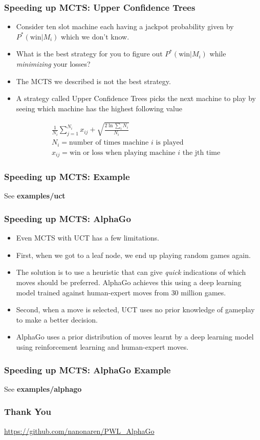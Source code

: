 \documentclass{beamer}
\begin{document}
\begin{frame}
  \frametitle{Speeding up MCTS: Upper Confidence Trees}
  \begin{itemize}
  \item Consider ten slot machine each having a jackpot probability given by $P^*(\text{win} | M_i)$ which we don't know.
    \pause
  \item What is the best strategy for you to figure out $P^*(\text{win} | M_i)$ while \emph{minimizing} your losses?
    \pause
  \item The MCTS we described is not the best strategy.
    \pause
  \item A strategy called Upper Confidence Trees picks the next machine to play by seeing which machine has the highest following value
  \end{itemize}
  \pause
  \begin{align*}
    &\frac{1}{N_i}\sum_{j=1}^{N_i} x_{ij} + \sqrt{\frac{2\ln \sum_i N_i}{N_i}}\\
    &N_i = \text{number of times machine } i \text{ is played}\\
    &x_{ij} = \text{win or loss when playing machine } i \text{ the jth time}
  \end{align*}
\end{frame}

\begin{frame}
  \frametitle{Speeding up MCTS: Example}
  \begin{center}
    See \textbf{examples/uct}
  \end{center}
\end{frame}

\begin{frame}
  \frametitle{Speeding up MCTS: AlphaGo}
  \begin{itemize}
  \item Even MCTS with UCT has a few limitations.
    \pause
  \item First, when we got to a leaf node, we end up playing random games again.
    \pause
  \item The solution is to use a heuristic that can give \emph{quick}
    indications of which moves should be preferred. AlphaGo achieves
    this using a deep learning model trained against human-expert
    moves from $30$ million games.
    \pause
  \item Second, when a move is selected, UCT uses no prior knowledge of gameplay to make a better decision.
    \pause
  \item AlphaGo uses a prior distribution of moves learnt by a deep
    learning model using reinforcement learning and human-expert moves.
  \end{itemize}
\end{frame}

\begin{frame}
  \frametitle{Speeding up MCTS: AlphaGo Example}
  \begin{center}
    See \textbf{examples/alphago}
  \end{center}
\end{frame}

\begin{frame}
  \frametitle{Thank You}
  \begin{center}
    \url{https://github.com/nanonaren/PWL_AlphaGo}
  \end{center}
\end{frame}
\end{document}

